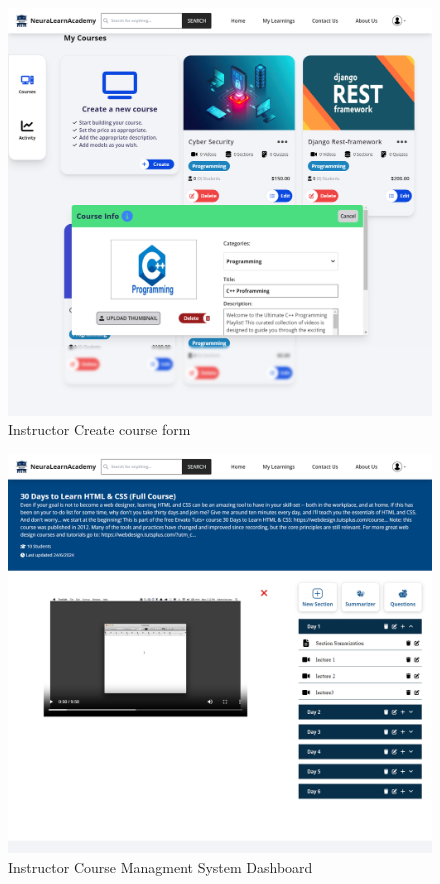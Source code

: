 \begin{figure}[h!]
	\centering
	\includegraphics[max height=\textheight,max width=\textwidth]{figures/frontend/createcourse.png}
	\caption{Instructor Create course form}
\end{figure}

\begin{figure}[h!]
	\centering
	\includegraphics[max height=\textheight,max width=\textwidth]{figures/frontend/dashboard-cms.png}
	\caption{Instructor Course Managment System Dashboard}
\end{figure}

